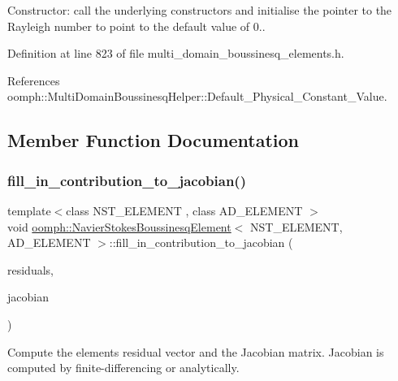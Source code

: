 Constructor\+: call the underlying constructors and initialise the pointer to the Rayleigh number to point to the default value of 0.. 



Definition at line 823 of file multi\+\_\+domain\+\_\+boussinesq\+\_\+elements.\+h.



References oomph\+::\+Multi\+Domain\+Boussinesq\+Helper\+::\+Default\+\_\+\+Physical\+\_\+\+Constant\+\_\+\+Value.



\subsection{Member Function Documentation}
\mbox{\label{classoomph_1_1NavierStokesBoussinesqElement_a01483469b070309aeb8948273b974feb}} 
\subsubsection{\texorpdfstring{fill\+\_\+in\+\_\+contribution\+\_\+to\+\_\+jacobian()}{fill\_in\_contribution\_to\_jacobian()}}
{\footnotesize\ttfamily template$<$class N\+S\+T\+\_\+\+E\+L\+E\+M\+E\+NT , class A\+D\+\_\+\+E\+L\+E\+M\+E\+NT $>$ \\
void \hyperlink{classoomph_1_1NavierStokesBoussinesqElement}{oomph\+::\+Navier\+Stokes\+Boussinesq\+Element}$<$ N\+S\+T\+\_\+\+E\+L\+E\+M\+E\+NT, A\+D\+\_\+\+E\+L\+E\+M\+E\+NT $>$\+::fill\+\_\+in\+\_\+contribution\+\_\+to\+\_\+jacobian (\begin{DoxyParamCaption}\item[{Vector$<$ double $>$ \&}]{residuals,  }\item[{Dense\+Matrix$<$ double $>$ \&}]{jacobian }\end{DoxyParamCaption})\hspace{0.3cm}{\ttfamily [inline]}}



Compute the element\textquotesingle{}s residual vector and the Jacobian matrix. Jacobian is computed by finite-\/differencing or analytically. 




